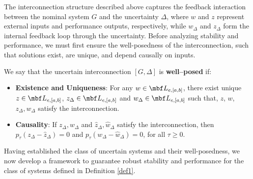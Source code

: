 The interconnection structure described above captures the feedback interaction between the nominal system $G$ and the uncertainty $\Delta$, where $w$ and $z$ represent external inputs and performance outputs, respectively, while $w_\Delta$ and $z_\Delta$ form the internal feedback loop through the uncertainty. Before analyzing stability and performance, we must first ensure the well-posedness of the interconnection, such that solutions exist, are unique, and depend causally on inputs.
\begin{definition}
	We say that the uncertain interconnection $[G,\Delta]$ is \textbf{well--posed} if:
	\begin{itemize}
		\item \textbf{Existence and Uniqueness}: For any $w\in \mbf L_{e, [a, b]}$, there exist unique $z\in\mbf L_{e, [a, b]}$, $z_\Delta \in \mbf L_{e, [a, b]}$ and $w_\Delta \in  \mbf L_{e, [a, b]}$ such that, $z$, $w$, $z_\Delta, w_\Delta$ satisfy the interconnection.
		\item \textbf{Causality}: If $z_\Delta, w_\Delta$ and $\hat{z}_\Delta, \hat{w}_\Delta$ satisfy the interconnection, then $p_\tau(z_\Delta - \hat{z}_\Delta) = 0$ and $p_\tau(w_\Delta - \hat{w}_\Delta) = 0$, for all $\tau \geq 0$.
	\end{itemize}
\end{definition}
Having established the class of uncertain systems and their well-posedness, we now develop a framework to guarantee robust stability and performance for the class of systems defined in Definition \ref{def1}.
